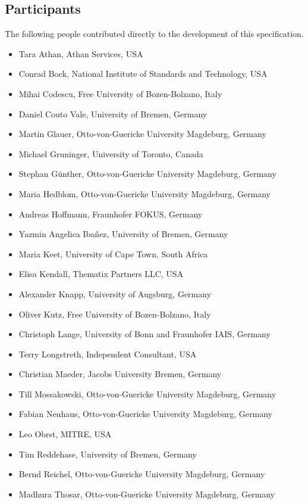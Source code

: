 \documentclass[10pt,fleqn,final]{scrreprt}
\newenvironment{definitions}[0]{\medskip }{}
\begin{document}
\begin{definitions}
\subsection{Participants}
The following people contributed directly to the development of this specification. 
	\begin{itemize}
	\item Tara Athan, Athan Services, USA 
	\item Conrad Bock, National Institute of Standards and Technology, USA
	\item Mihai Codescu, Free University of Bozen-Bolzano, Italy 
        \item Daniel Couto Vale, University of Bremen, Germany
        \item Martin Glauer, Otto-von-Guericke University Magdeburg, Germany
	\item Michael Gruninger, University of Toronto, Canada  
        \item Stephan Günther, Otto-von-Guericke University Magdeburg, Germany
        \item Maria Hedblom, Otto-von-Guericke University Magdeburg, Germany
	\item Andreas Hoffmann, Fraunhofer FOKUS, Germany 
        \item Yazmin Angelica Iba\~nez, University of Bremen, Germany
	\item Maria Keet, University of Cape Town, South Africa 
	\item Elisa Kendall, Thematix Partners LLC, USA	
        \item Alexander Knapp, University of Augsburg, Germany
	\item Oliver Kutz, Free University of Bozen-Bolzano, Italy
	\item Christoph Lange, University of Bonn and Fraunhofer IAIS, Germany
	\item Terry Longstreth, Independent Consultant, USA 	
        \item Christian Maeder, Jacobs University Bremen, Germany
	\item Till Mossakowski, Otto-von-Guericke University Magdeburg, Germany  	
	\item Fabian Neuhaus, Otto-von-Guericke University Magdeburg, Germany  	  
	\item Leo Obrst, MITRE, USA
        \item Tim Reddehase, University of Bremen, Germany
	\item Bernd Reichel, Otto-von-Guericke University Magdeburg, Germany  	        \item Madhura Thosar, Otto-von-Guericke University Magdeburg, Germany
   

\end{itemize}
\end{definitions}
\end{document}
